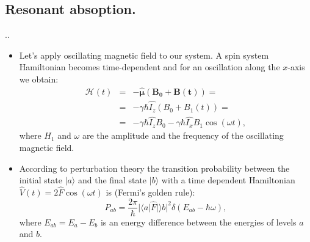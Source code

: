 \documentclass{beamer}
\begin{document}
\subsection{Resonant absoption.}

\begin{frame}{\thesection.\thesubsection. \insertsubsection}
	\begin{itemize}[<+>]
		\item 
			Let's apply oscillating magnetic field to our system. A spin system Hamiltonian becomes time-dependent and for an oscillation along the $x$-axis we obtain:
			\begin{equation} \label{eq:oscillating_field}
			\begin{array}{lcl}
			\mathcal{H}(t) &=& -\bm{\hat{\mu}} \bm{(B_0+B(t))}=  \\
			&=& -\gamma \hbar \hat{I_z} (B_0 + B_1(t)) =\\
			&=&-\gamma \hbar \hat{I_z} B_0  -\gamma \hbar \hat{I_x} B_1 \cos(\omega t),
			\end{array}
			\end{equation}
			where $H_1$ and $\omega$ are the amplitude and the frequency of the oscillating magnetic field.
		\item
		 According to perturbation theory the transition probability between the initial state $\vert a \rangle$ and the final state $\vert b \rangle$ with a time dependent Hamiltonian $ \hat{V} (t) = 2 \hat{F} \cos (\omega t ) $ is (Fermi's golden rule):
		 \begin{equation} \label{eq:probability}
		 P_{ab} = \frac{2 \pi}{\hbar} \vert \langle a \vert \hat{F} \vert \rangle b \vert ^2 \delta(E_{ab}-\hbar \omega),
		 \end{equation}
		 where $E_{ab} = E_a - E_b$ is an energy difference between the energies of levels $a$ and $b$. 

		
	\end{itemize}
\end{frame}	
\end{document}
